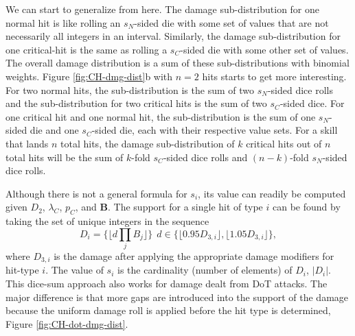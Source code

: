 \documentclass{article}
\begin{document}

        We can start to generalize from here. The damage sub-distribution for one normal hit is like rolling an $s_N$-sided die with some set of values that are not necessarily all integers in an interval. Similarly, the damage sub-distribution for one critical-hit is the same as rolling a $s_C$-sided die with some other set of values. The overall damage distribution is a sum of these sub-distributions with binomial weights. Figure \ref{fig:CH-dmg-dist}b with $n=2$ hits starts to get more interesting. For two normal hits, the sub-distribution is the sum of two $s_N$-sided dice rolls and the sub-distribution for two critical hits is the sum of two $s_C$-sided dice. For one critical hit and one normal hit, the sub-distribution is the sum of one $s_N$-sided die and one $s_C$-sided die, each with their respective value sets. For a skill that lands $n$ total hits, the damage sub-distribution of $k$ critical hits out of $n$ total hits will be the sum of $k$-fold $s_C$-sided dice rolls and $(n-k)$-fold $s_N$-sided dice rolls. 
        
        Although there is not a general formula for $s_i$, its value can readily be computed given $D_2$, $\lambda_C$, $p_C$, and \textbf{B}. The support for a single hit of type $i$ can be found by taking the set of unique integers in the sequence
        \begin{equation}\label{eqn:supp}
            D_i = \{\lfloor d  \prod_j B_j \rfloor \}
            \:\: d \in \{\lfloor 0.95 D_{3,i} \rfloor, \lfloor 1.05 D_{3,i} \rfloor \},   
        \end{equation}
        where $D_{3,i}$ is the damage after applying the appropriate damage modifiers for hit-type $i$. The value of $s_i$ is the cardinality (number of elements) of $D_i$, $|D_i|$. This dice-sum approach also works for damage dealt from DoT attacks. The major difference is that more gaps are introduced into the support of the damage because the uniform damage roll is applied before the hit type is determined, Figure \ref{fig:CH-dot-dmg-dist}.
\end{document}
